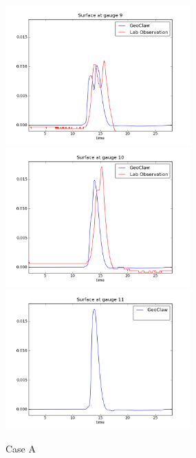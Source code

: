 \begin{figure}[ht]
\hfil\includegraphics[width=2.8in]{bp5/CaseA/gauge0009fig300.png}\hfil
\vskip 5pt
\hfil\includegraphics[width=2.8in]{bp5/CaseA/gauge0010fig300.png}\hfil
\hfil\includegraphics[width=2.8in]{bp5/CaseA/gauge0011fig300.png}\hfil
\caption{\label{fig:bp2A} Case A }
\end{figure}

